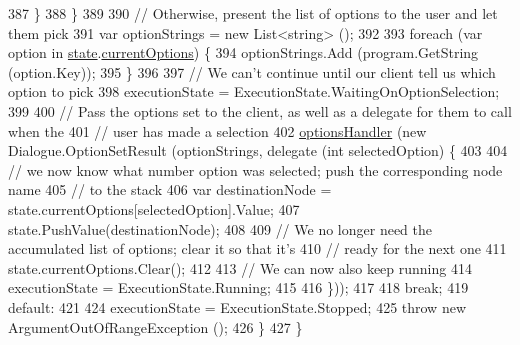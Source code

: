 \begin{DoxyCode}
387                     \}
388                 \}
389 
390                 \textcolor{comment}{// Otherwise, present the list of options to the user and let them pick}
391                 var optionStrings = \textcolor{keyword}{new} List<string> ();
392 
393                 \textcolor{keywordflow}{foreach} (var option \textcolor{keywordflow}{in} \hyperlink{a00152_a70f2ce6201cdd2430ceaa764ac614ca0}{state}.\hyperlink{a00155_ab816dfea32ecda23282700f01454e0a9}{currentOptions}) \{
394                     optionStrings.Add (program.GetString (option.Key));
395                 \}
396 
397                 \textcolor{comment}{// We can't continue until our client tell us which option to pick}
398                 executionState = ExecutionState.WaitingOnOptionSelection;
399 
400                 \textcolor{comment}{// Pass the options set to the client, as well as a delegate for them to call when the}
401                 \textcolor{comment}{// user has made a selection}
402                 \hyperlink{a00152_acd25fe2e3aa90dc87ba25d9af904465b}{optionsHandler} (\textcolor{keyword}{new} Dialogue.OptionSetResult (optionStrings, delegate (\textcolor{keywordtype}{int} 
      selectedOption) \{
403 
404                     \textcolor{comment}{// we now know what number option was selected; push the corresponding node name}
405                     \textcolor{comment}{// to the stack}
406                     var destinationNode = state.currentOptions[selectedOption].Value;
407                     state.PushValue(destinationNode);
408 
409                     \textcolor{comment}{// We no longer need the accumulated list of options; clear it so that it's}
410                     \textcolor{comment}{// ready for the next one}
411                     state.currentOptions.Clear();
412 
413                     \textcolor{comment}{// We can now also keep running}
414                     executionState = ExecutionState.Running;
415 
416                 \}));
417 
418                 \textcolor{keywordflow}{break};
419             \textcolor{keywordflow}{default}:
421 
424                 executionState = ExecutionState.Stopped;
425                 \textcolor{keywordflow}{throw} \textcolor{keyword}{new} ArgumentOutOfRangeException ();
426             \}
427         \}
\end{DoxyCode}


